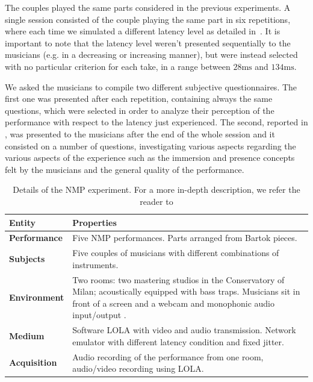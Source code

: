 The couples played the same parts considered in the previous experiments. A single session consisted of the couple playing the same part in six repetitions, where each time we simulated a different latency level as detailed in~\cite{CIM2018}. It is important to note that the latency level weren't presented sequentially to the musicians (e.g. in a decreasing or increasing manner), but were instead selected with no particular criterion for each take, in a range between $28\mathrm{ms}$ and $134\mathrm{ms}$.

We asked the musicians to compile two different subjective questionnaires. The first one was presented  after each repetition, containing always the same questions, which were selected in order to analyze their perception of the performance with respect to the latency just experienced. The second, reported in \cite{CIM2018}, was presented to the musicians after the end of the whole session and it consisted on a number of questions, investigating various aspects regarding the various aspects of the experience such as the immersion and presence concepts felt by the musicians and the general quality of the performance.












\begin{table}
	\centering
	\caption{Details of the NMP experiment. For a more in-depth description, we refer the reader to \cite{CIM2018} }
	\begin{tabular}{p{1.5cm}p{6cm}}
		\hline
		\textbf{Entity} & \textbf{Properties} \\
		\hline
		\textbf{Performance} & Five NMP performances. \newline  Parts arranged from Bartok pieces. \\
		\textbf{Subjects} & Five couples of musicians with different combinations of instruments. \\
		\textbf{Environment} & Two rooms: two mastering studios in the Conservatory of Milan; acoustically equipped with bass traps. Musicians sit in front of a screen and a webcam and monophonic audio input/output .\\
		\textbf{Medium} & Software LOLA with video and audio transmission. Network emulator with different latency condition and fixed jitter. \\
		\textbf{Acquisition} & Audio recording of the performance from one room, audio/video recording using LOLA.\\
		\hline
	\end{tabular}
	\label{tab:exp2}
\end{table}


